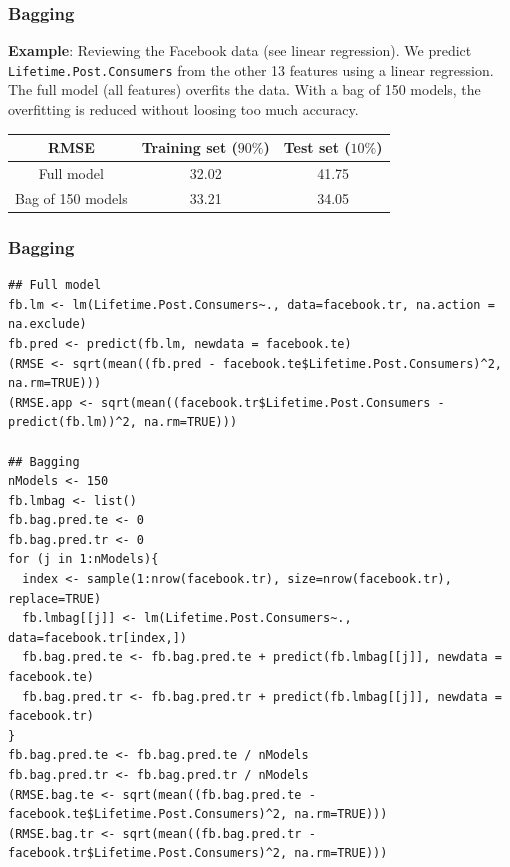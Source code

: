 \begin{frame}
\frametitle{Bagging}
{\bf Example}: Reviewing the Facebook data (see linear regression). We predict {\tt Lifetime.Post.Consumers} from the other 13 features using a linear regression. The full model (all features) overfits the data. With a bag of 150 models, the overfitting is reduced without loosing too much accuracy.
\begin{center}
\begin{tabular}{c|c|c|}
RMSE & Training set ($90\%$)& Test set ($10\%$)\\
\hline
Full model & 32.02 & 41.75\\ 
\hline
Bag of 150 models & 33.21 & 34.05\\ 
\hline
\end{tabular}
\end{center}
\end{frame}
\begin{frame}[fragile]
\frametitle{Bagging}
\tiny
\begin{verbatim}
## Full model
fb.lm <- lm(Lifetime.Post.Consumers~., data=facebook.tr, na.action = na.exclude)
fb.pred <- predict(fb.lm, newdata = facebook.te)
(RMSE <- sqrt(mean((fb.pred - facebook.te$Lifetime.Post.Consumers)^2, na.rm=TRUE)))
(RMSE.app <- sqrt(mean((facebook.tr$Lifetime.Post.Consumers - predict(fb.lm))^2, na.rm=TRUE)))

## Bagging
nModels <- 150
fb.lmbag <- list()
fb.bag.pred.te <- 0
fb.bag.pred.tr <- 0
for (j in 1:nModels){
  index <- sample(1:nrow(facebook.tr), size=nrow(facebook.tr), replace=TRUE)
  fb.lmbag[[j]] <- lm(Lifetime.Post.Consumers~., data=facebook.tr[index,])
  fb.bag.pred.te <- fb.bag.pred.te + predict(fb.lmbag[[j]], newdata = facebook.te)
  fb.bag.pred.tr <- fb.bag.pred.tr + predict(fb.lmbag[[j]], newdata = facebook.tr)
}
fb.bag.pred.te <- fb.bag.pred.te / nModels
fb.bag.pred.tr <- fb.bag.pred.tr / nModels
(RMSE.bag.te <- sqrt(mean((fb.bag.pred.te - facebook.te$Lifetime.Post.Consumers)^2, na.rm=TRUE)))
(RMSE.bag.tr <- sqrt(mean((fb.bag.pred.tr - facebook.tr$Lifetime.Post.Consumers)^2, na.rm=TRUE)))
\end{verbatim}
\end{frame}
